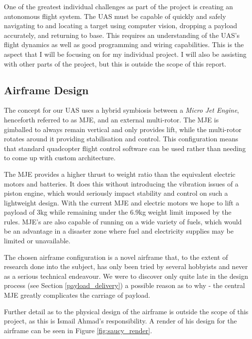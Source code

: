 \documentclass[11pt]{article}
\begin{document}
One of the greatest individual challenges as part of the project is creating an autonomous flight system. The UAS must be capable of quickly and safely navigating to and locating a target using computer vision, dropping a payload accurately, and returning to base. This requires an understanding of the UAS’s flight dynamics as well as good programming and wiring capabilities. This is the aspect that I will be focusing on for my individual project. I will also be assisting with other parts of the project, but this is outside the scope of this report.


\subsection{Airframe Design}
The concept for our UAS uses a hybrid symbiosis between a \emph{Micro Jet Engine}, henceforth referred to as MJE, and an external multi-rotor. The MJE is gimballed to always remain vertical and only provides lift, while the multi-rotor rotates around it providing stabilisation and control. This configuration means that standard quadcopter flight control software can be used rather than needing to come up with custom architecture.

The MJE provides a higher thrust to weight ratio than the equivalent electric motors and batteries. It does this without introducing the vibration issues of a piston engine, which would seriously impact stability and control on such a lightweight design. With the current MJE and electric motors we hope to lift a payload of 3kg while remaining under the 6.9kg weight limit imposed by the rules\cite{IMechE_rules}. MJE's are also capable of running on a wide variety of fuels, which would be an advantage in a disaster zone where fuel and electricity supplies may be limited or unavailable\cite{Ismail_paper}.

The chosen airframe configuration is a novel airframe that, to the extent of research done into the subject, has only been tried by several hobbyists and never as a serious technical endeavour. We were to discover only quite late in the design process (see Section \ref{payload_delivery}) a possible reason as to why - the central MJE greatly complicates the carriage of payload.

Further detail as to the physical design of the airframe is outside the scope of this project, as this is Ismail Ahmad's responsibility\cite{Ismail_paper}. A render of his design for the airframe can be seen in Figure \ref{fig:saucy_render}\cite{Ismail_paper}.
\end{document}
